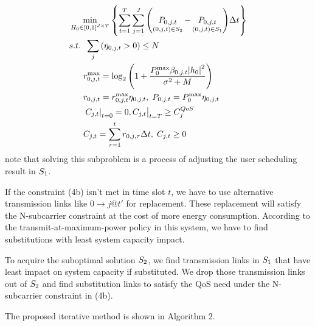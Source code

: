 \documentclass{ieeeaccess}
\begin{document}
\begin{subequations}
\begin{align}
& \mathop {\min }\limits_{{{\bf{{\rm H}}}_{\bf{0}}} \in {{\left[ {0,1} \right]}^{J \times T}}} \left\{ {\sum\limits_{t = 1}^T {\sum\limits_{j = 1}^J {\left( {\mathop {{P_{0,j,t}}}\limits_{\left( {0,j,t} \right) \in {{\bf{S}}_{\bf{2}}}}  - \mathop {{P_{0,j,t}}}\limits_{\left( {0,j,t} \right) \in {{\bf{S}}_{\bf{1}}}} } \right)} \Delta t} } \right\} \\
& {s.t.} \;\; \sum\limits_j  {\left( {{\eta _{0,j,t}} > 0} \right)}  \le N \\
& \;\;\;\;\;\; r_{0,j,t}^{\max } = {\log _2}\left( {1 + \frac{{P_0^{\max }{\beta _{0,j,t}}{{\left| {{h_0}} \right|}^2}}}{{{\sigma ^2} + M}}} \right) \\
& \;\;\;\;\;\; {r_{0,j,t}} = r_{0,j,t}^{\max }{\eta _{0,j,t}},\; {P_{0,j,t}} = P_0^{\max }{\eta _{0,j,t}} \\
& \;\;\;\;\;\; {\left. {{{\left. {{C_{j,t}}} \right|}_{t = 0}} = 0, {C_{j,t}}} \right|_{t = T}} \ge C_j^{QoS} \\
& \;\;\;\;\;\; {C_{j,t}} = \sum\limits_{\tau  = 1}^t {{r_{0,j,\tau }}\Delta t} ,\; {C_{j,t}} \ge 0
\end{align}
\end{subequations}
note that solving this subproblem is a process of adjusting the user scheduling result in ${{\bf{S}}_{\bf{1}}}$.

If the constraint (4b) isn't met in time slot ${t}$, we have to use alternative transmission links like $0 \to j@t'$ for replacement. These replacement will satisfy the N-subcarrier constraint at the cost of more energy consumption. According to the transmit-at-maximum-power policy in this system, we have to find substitutions with least system capacity impact.

To acquire the suboptimal solution ${{\bf{S}}_{\bf{2}}}$, we find transmission links in ${{\bf{S}}_{\bf{1}}}$ that have least impact on system capacity if substituted. We drop those transmission links out of ${{\bf{S}}_{\bf{2}}}$ and find substitution links to satisfy the QoS need under the N-subcarrier constraint in (4b).

The proposed iterative method is shown in Algorithm 2.
\end{document}
